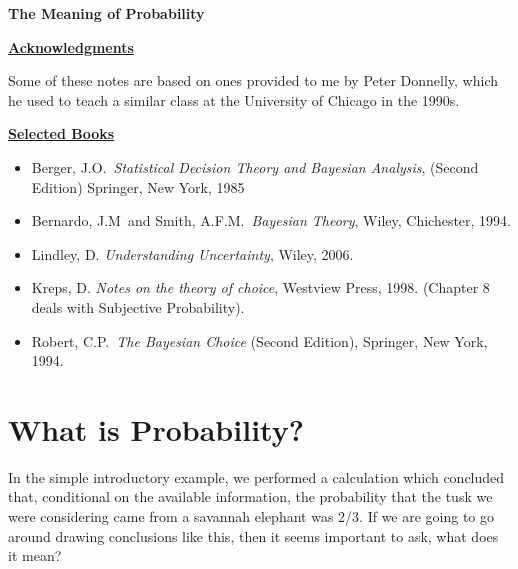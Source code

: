 \documentclass{article}[11pt]
\begin{document}


\begin{center}
\Large\bf The Meaning of Probability
\end{center}
\vskip 6mm
\normalsize

\underline{\Large{\bf Acknowledgments}}
\bigskip

% 
Some of these notes are based on ones provided to me by Peter Donnelly,
which he used to teach a similar class at the University of Chicago in the 1990s.
\vskip 6mm

\underline{\Large{\bf Selected Books}}
\bigskip
\begin{itemize}
\item Berger, J.O.\ {\it Statistical Decision Theory and Bayesian Analysis}, (Second Edition) Springer, New York, 1985
\item Bernardo, J.M\ and Smith, A.F.M.\ {\it Bayesian Theory}, Wiley, Chichester, 1994.
\item Lindley, D. {\it Understanding Uncertainty}, Wiley, 2006.
\item Kreps, D. {\it Notes on the theory of choice}, Westview Press, 1998. (Chapter 8 deals with Subjective Probability).
\item Robert, C.P.\ {\it The Bayesian Choice} (Second Edition), Springer, New York, 1994.
\end{itemize}

\section{What is Probability?}

In the simple introductory example, we performed a calculation which
concluded that, conditional on the available information, 
the probability that the tusk we were considering came from a savannah elephant was 2/3. If we are going to go around drawing conclusions like this, then it seems
important to ask, what does it mean?
\end{document}
